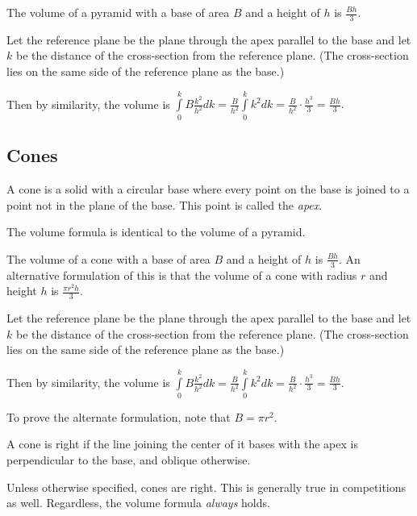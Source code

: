 \begin{theo}
The volume of a pyramid with a base of area $B$ and a height of $h$ is $\frac{Bh}{3}.$
\end{theo}

\begin{pro}
Let the reference plane be the plane through the apex parallel to the base and let $k$ be the distance of the cross-section from the reference plane. (The cross-section lies on the same side of the reference plane as the base.)

Then by similarity, the volume is $\int\limits_0^k B\frac{k^2}{h^2}dk=\frac{B}{h^2}\int\limits_0^k k^2dk=\frac{B}{h^2}\cdot\frac{h^3}{3}=\frac{Bh}{3}.$
\end{pro}

\subsection{Cones}

\begin{defi}
A cone is a solid with a circular base where every point on the base is joined to a point not in the plane of the base. This point is called the \textit{apex}.
\end{defi}

The volume formula is identical to the volume of a pyramid.

\begin{theo}
The volume of a cone with a base of area $B$ and a height of $h$ is $\frac{Bh}{3}.$ An alternative formulation of this is that the volume of a cone with radius $r$ and height $h$ is $\frac{\pi r^2h}{3}.$
\end{theo}

\begin{pro}
Let the reference plane be the plane through the apex parallel to the base and let $k$ be the distance of the cross-section from the reference plane. (The cross-section lies on the same side of the reference plane as the base.)

Then by similarity, the volume is $\int\limits_0^k B\frac{k^2}{h^2}dk=\frac{B}{h^2}\int\limits_0^k k^2dk=\frac{B}{h^2}\cdot\frac{h^3}{3}=\frac{Bh}{3}.$

To prove the alternate formulation, note that $B=\pi r^2.$
\end{pro}

\begin{defi}
A cone is right if the line joining the center of it bases with the apex is perpendicular to the base, and oblique otherwise.
\end{defi}
Unless otherwise specified, cones are right. This is generally true in competitions as well. Regardless, the volume formula \textit{always} holds.

